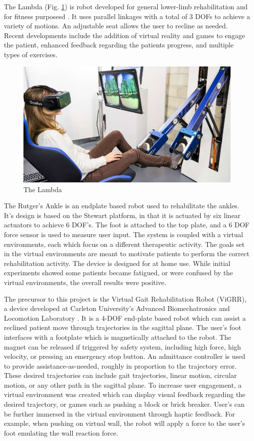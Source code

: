 \documentclass[12pt]{report}
\begin{document}
	The Lambda (Fig. \ref{fig:Lambda}) is robot developed for general lower-limb rehabilitation and for fitness purposesd \cite{Bouri2009}. It uses parallel linkages with a total of 3 DOFs to achieve a variety of motions. An adjustable seat allows the user to recline as needed. Recent developments include the addition of virtual reality and games to engage the patient, enhanced feedback regarding the patients progress, and multiple types of exercises. 
	
	\begin{figure}[t] 
		\centering
		\includegraphics[width=0.75\linewidth]{Lambda}
		\caption{The Lambda}
		\label{fig:Lambda}
	\end{figure}
	
	The Rutger's Ankle \cite{Burdea2000} is an endplate based robot used to rehabilitate the ankles. It's design is based on the Stewart platform, in that it is actuated by six linear actuators to achieve 6 DOF's. The foot is attached to the top plate, and a 6 DOF force sensor is used to measure user input. The system is coupled with a virtual environments, each which focus on a different therapeutic activity. The goals set in the virtual environments are meant to motivate patients to perform the correct rehabilitation activity. The device is designed for at home use. While initial experiments showed some patients became fatigued, or were confused by the virtual environments, the overall results were positive. 
	
	The precursor to this project is the Virtual Gait Rehabilitation Robot (ViGRR), a device developed at Carleton University's Advanced Biomechatronics and Locomotion Laboratory \cite{Chisholm2014, Chisholm2010}. It is a 4-DOF end-plate based robot which can assist a reclined patient move through trajectories in the sagittal plane. The user's foot interfaces with a footplate which is magnetically attached to the robot. The magnet can be released if triggered by safety system, including high force, high velocity, or pressing an emergency stop button. An admittance controller is used to provide assistance-as-needed, roughly in proportion to the trajectory error. These desired trajectories can include gait trajectories, linear motion, circular motion, or any other path in the sagittal plane. To increase user engagement, a virtual environment was created which can display visual feedback regarding the desired trajectory, or games such as pushing a block or brick breaker. User's can be further immersed in the virtual environment through haptic feedback. For example, when pushing on virtual wall, the robot will apply a force to the user's foot emulating the wall reaction force. 
	
\end{document}
